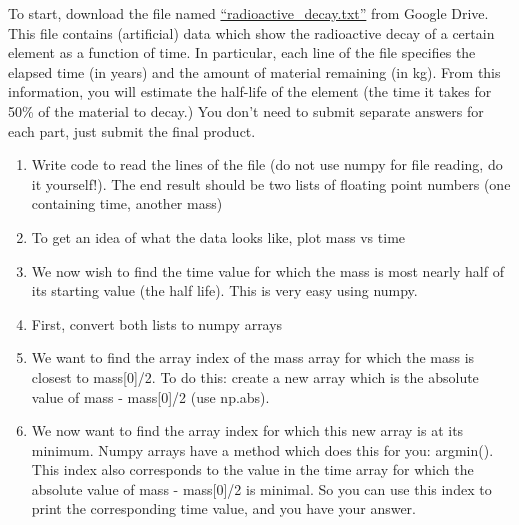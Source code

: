 \documentclass{article}
\begin{document}
\begin{enumerate}
	 To start, download the file named \href{https://drive.google.com/file/d/1lz4FUpurVnJLiNGjxm2FzYb0RvjCXiRE/view?usp=sharing}{``radioactive\_decay.txt''} from Google Drive. This file contains (artificial) data which show the radioactive decay of a certain element as a function of time. In particular, each line of the file specifies the elapsed time (in years) and the amount of material remaining (in kg). From this information, you will estimate the half-life of the element (the time it takes for 50\% of the material to decay.) You don't need to submit separate answers for each part, just submit the final product.
	 \begin{enumerate}
	 	\item Write code to read the lines of the file (do not use numpy for file reading, do it yourself!). The end result should be two lists of floating point numbers (one containing time, another mass)
	 	\item To get an idea of what the data looks like, plot mass vs time
	 	\item We now wish to find the time value for which the mass is most nearly half of its starting value (the half life). This is very easy using numpy. 
	 	\item First, convert both lists to numpy arrays
	 	\item We want to find the array index of the mass array for which the mass is closest to mass[0]/2. To do this: create a new array which is the absolute value of mass - mass[0]/2 (use np.abs).
	 	\item We now want to find the array index for which this new array is at its minimum. Numpy arrays have a method which does this for you: argmin(). This index also corresponds to the value in the time array for which the absolute value of mass - mass[0]/2 is minimal. So you can use this index to print the corresponding time value, and you have your answer.
	 \end{enumerate}
\end{enumerate}
\end{document}
